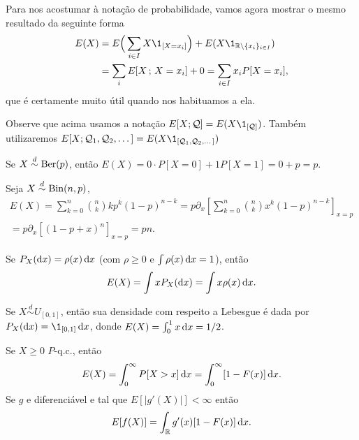 Para nos acostumar à notação de probabilidade, vamos agora mostrar o mesmo resultado da seguinte forma
\begin{equation}
  \begin{split}
    E(X) & = E\Big(\sum_{i\in I} X \1_{[X = x_i]}\Big) + E(X \1_{\bbR \setminus \{x_i\}_{i\in I}})\\
    & = \sum_i E[X\, ; \, X = x_i] + 0 = \sum_{i\in I} x_i P[X = x_i],
  \end{split}
\end{equation}
que é certamente muito útil quando nos habituamos a ela.

Observe que acima usamos a notação $E[X; \mathcal{Q}] = E(X \1_{[\mathcal{Q}]})$.
Também utilizaremos $E[X; \mathcal{Q}_1, \mathcal{Q}_2, \dots] = E(X \1_{[\mathcal{Q}_1, \mathcal{Q}_2, \dots]})$

\begin{example}
  Se $X \overset{d}\sim \operatorname{Ber}(p)$, então $E(X) = 0 \cdot P[X = 0] + 1 P[X = 1] = 0 + p = p$.
\end{example}

\begin{example}
  Seja $X \overset{d}\sim \operatorname{Bin}(n,p)$,
  \begin{multline}
    E(X) = \sum_{k=0}^n\binom{n}{k}   k p^k(1-p)^{n-k}= p\partial_x \left[\sum_{k=0}^n\binom{n}{k}  x^k(1-p)^{n-k} \right]_{x=p}
    \\= p \partial_x \left[ (1-p+x)^n \right]_{x=p}=pn.
  \end{multline}
\end{example}

\begin{example}
Se $P_X(\mathop{}\!\mathrm{d} x) = \rho(x) \mathop{}\!\mathrm{d} x$ (com $\rho \geq 0$ e $\int \rho(x) \mathop{}\!\mathrm{d} x = 1$), então
\begin{equation}
  E(X) = \int x  P_X(\mathop{}\!\mathrm{d} x) = \int x \rho(x) \mathop{}\!\mathrm{d} x.
\end{equation}
\end{example}

\begin{example}
  Se $X \overset{d}\sim U_{[0,1]}$, então sua densidade com respeito a Lebesgue é dada por
  $P_X(\d x) = \1_{[0,1]} \d x$, donde $E(X) = \int_0^1 x \mathop{}\!\mathrm{d} x = 1/2$.
\end{example}

\begin{proposition}
  \label{p:espera_acumulada}
  Se $X \geq 0$ $P$-q.c., então
  \begin{equation}
    E(X) = \int_0^\infty P[X > x] \mathop{}\!\mathrm{d} x = \int_0^\infty [1 - F(x)] \mathop{}\!\mathrm{d} x .
  \end{equation}
  Se $g$ e diferenciável e tal que $E[|g'(X)|]<\infty$ então
    \begin{equation}
    E[f(X)] = \int_{\mathbb R} g'(x) [1 - F(x)] \mathop{}\!\mathrm{d} x .
  \end{equation}
\end{proposition}

